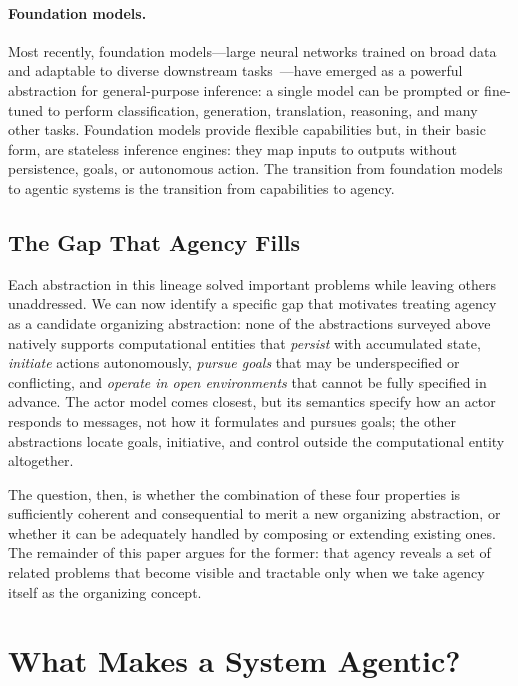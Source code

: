 \documentclass[11pt]{article}
\begin{document}
\paragraph{Foundation models.}
Most recently, foundation models---large neural networks trained on broad data and adaptable to diverse downstream tasks~\cite{bommasani_foundation}---have emerged as a powerful abstraction for general-purpose inference: a single model can be prompted or fine-tuned to perform classification, generation, translation, reasoning, and many other tasks. Foundation models provide flexible capabilities but, in their basic form, are stateless inference engines: they map inputs to outputs without persistence, goals, or autonomous action. The transition from foundation models to agentic systems is the transition from capabilities to agency.

\subsection{The Gap That Agency Fills}

Each abstraction in this lineage solved important problems while leaving others unaddressed. We can now identify a specific gap that motivates treating agency as a candidate organizing abstraction: none of the abstractions surveyed above natively supports computational entities that \textit{persist} with accumulated state, \textit{initiate} actions autonomously, \textit{pursue goals} that may be underspecified or conflicting, and \textit{operate in open environments} that cannot be fully specified in advance. The actor model comes closest, but its semantics specify how an actor responds to messages, not how it formulates and pursues goals; the other abstractions locate goals, initiative, and control outside the computational entity altogether.

The question, then, is whether the combination of these four properties is sufficiently coherent and consequential to merit a new organizing abstraction, or whether it can be adequately handled by composing or extending existing ones. The remainder of this paper argues for the former: that agency reveals a set of related problems that become visible and tractable only when we take agency itself as the organizing concept.

\section{What Makes a System Agentic?}
\label{sec:agentic}
\end{document}
